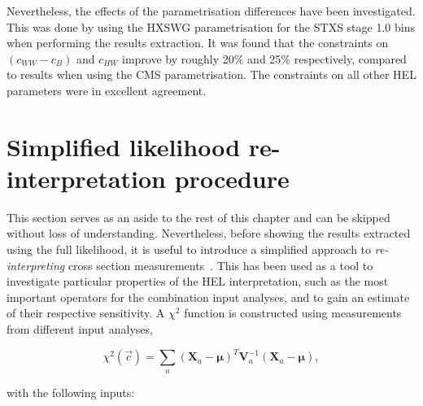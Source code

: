 Nevertheless, the effects of the parametrisation differences have been investigated. This was done by using the HXSWG parametrisation for the STXS stage 1.0 bins when performing the results extraction. It was found that the constraints on $(c_{WW}-c_B)$ and $c_{HW}$ improve by roughly 20\% and 25\% respectively, compared to results when using the CMS parametrisation. The constraints on all other HEL parameters were in excellent agreement.

\section{Simplified likelihood re-interpretation procedure}\label{sec:eft_simplified}
This section serves as an aside to the rest of this chapter and can be skipped without loss of understanding. Nevertheless, before showing the results extracted using the full likelihood, it is useful to introduce a simplified approach to \textit{re-interpreting} cross section measurements~\cite{}. This has been used as a tool to investigate particular properties of the HEL interpretation, such as the most important operators for the combination input analyses, and to gain an estimate of their respective sensitivity. A $\chi^2$ function is constructed using measurements from different input analyses,

\begin{equation}
    \chi^2(\vec{c}) = \sum_a (\mathbf{X}_a-\pmb{\mu})^T \mathbf{V}_a^{-1} (\mathbf{X}_a-\pmb{\mu}),
\end{equation}

\noindent
with the following inputs:

